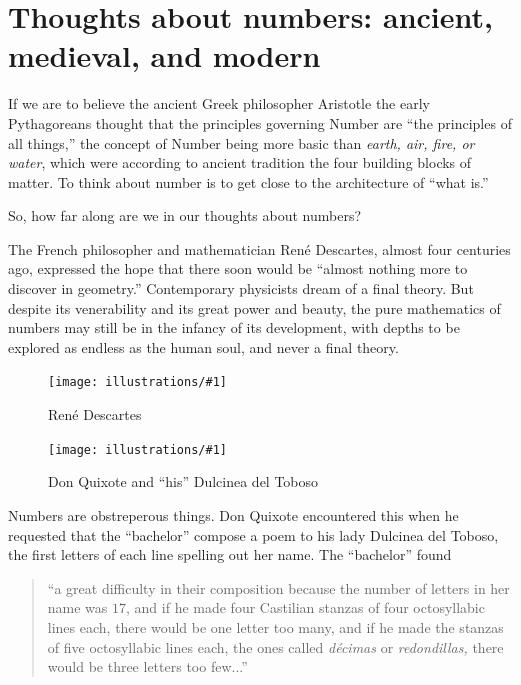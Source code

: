 \documentclass[11pt]{article}
\newcommand{\ill}[3]{ 
   \begin{figure}[H]
   \begin{center}
   \texttt{[image: illustrations/\#1]}
   \caption{#3}
   \end{center}
    \end{figure}
}
\theoremstyle{plain}
\theoremstyle{definition}
\numberwithin{equation}{section}
\numberwithin{figure}{section}
\numberwithin{table}{section}
\begin{document}
\section{Thoughts about numbers: ancient, medieval, and modern}

If we are to believe the ancient Greek philosopher Aristotle the early
Pythagoreans thought that the principles governing Number are ``the
principles of all things,'' the concept of Number being more basic than
{\em earth, air, fire, or water}, which were according to ancient tradition
the four building blocks of matter. To think about number is to get
close to the architecture of ``what is.''

So, how far along are we in our thoughts about numbers?

The French philosopher and mathematician Ren\'e Descartes, almost four
centuries ago, expressed the hope that there soon would be ``almost
nothing more to discover in geometry.'' Contemporary physicists dream
of a final theory.  But despite its
venerability and its great power and beauty, the pure mathematics of
numbers may still be in the infancy of its development, with depths to
be explored as endless as the human soul, and never a final theory.



\ill{descartes}{.3}{Ren\'e Descartes}


\ill{dulcinea1.jpg}{.2}{Don Quixote and ``his'' Dulcinea del Toboso}

Numbers are obstreperous things. Don Quixote encountered this when he
requested that the ``bachelor'' compose a poem to his lady Dulcinea del
Toboso, the first letters of each line spelling out her name. The
``bachelor'' found

\bigskip


\begin{quote}
  ``a great difficulty in their composition because the number of
  letters in her name was $17$, and if he made four Castilian stanzas
  of four octosyllabic lines each, there would be one letter too many,
  and if he made the stanzas of five octosyllabic lines each, the ones
  called {\em d{\'e}cimas} or {\em redondillas,} there would be three
  letters too few...''
\end{quote}
  
\end{document}
